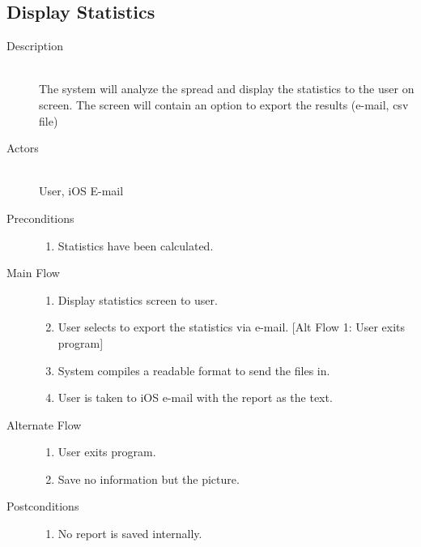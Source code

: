 \subsection{Display Statistics}
\begin{description}
    \item[Description] \hfill \\
        The system will analyze the spread and display the statistics to the user on screen.  The screen will contain an option to export the results (e-mail, csv file)
    \item[Actors] \hfill \\
        User, iOS E-mail
    \item[Preconditions] \hfill 
        \begin{enumerate}
            \item Statistics have been calculated.
        \end{enumerate}
    \item[Main Flow] \hfill 
        \begin{enumerate}
            \item Display statistics screen to user.
            \item User selects to export the statistics via e-mail.
                [Alt Flow 1: User exits program]
            \item System compiles a readable format to send the files in.
            \item User is taken to iOS e-mail with the report as the text.
        \end{enumerate}
    \item[Alternate Flow] \hfill 
        \begin{enumerate}
            \item User exits program.
            \item Save no information but the picture.
        \end{enumerate}
    \item[Postconditions] \hfill
        \begin{enumerate}
            \item No report is saved internally.
        \end{enumerate}
\end{description}
